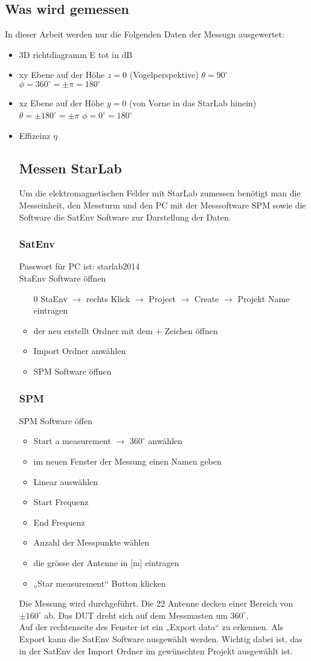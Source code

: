 \subsection{Was wird gemessen}
In dieser Arbeit werden nur die Folgenden Daten der Messugn ausgewertet:
\begin{itemize}
	\item 3D richtdiagramm E tot in dB
	\item xy Ebene auf der Höhe $z=0$ (Vogelperspektive) $\theta=90^\circ$ $\phi=360^\circ= \pm \pi=180^\circ$
	\item xz Ebene auf der Höhe $y=0$ (von Vorne in das StarLab hinein) $\theta=\pm 180^\circ =\pm \pi$ $\phi= 0^\circ = 180^\circ$
	\item Effizeinz $\eta$
	\subsection{Messen StarLab}
	Um die elektromagnetischen Felder mit StarLab zumessen benötigt man  die Messeinheit, den Messturm und den PC mit der Messsoftware SPM sowie die Software die SatEnv Software  zur Darstellung der Daten.
	\subsubsection{SatEnv}
	Passwort für PC ist: starlab2014\\
	StaEnv Software öffnen
	\begin{itemize}
	\item [0]StaEnv $\rightarrow$ rechts Klick $\rightarrow$ Project $\rightarrow$ Create $\rightarrow$ Projekt Name eintragen
	\item der neu erstellt Ordner mit dem $+$ Zeichen öffnen
	\item Import Ordner anwählen
	\item SPM Software öffnen
	\end{itemize}
	\subsubsection{SPM}
	SPM Software öffen
	\begin{itemize}
	\item Start a measurement $\rightarrow$ $360^\circ$ anwählen 
	\item im neuen Fenster der Messung einen Namen geben
	\item Linear auswählen
	\item Start Frequenz
	\item End Frequenz 
	\item Anzahl der Messpunkte wählen
	\item die grösse der Antenne in [m] eintragen
	\item „Star measurement“ Button klicken
	\end{itemize}
	Die Messung wird durchgeführt. Die 22 Antenne decken einer Bereich von $\pm 160^\circ$ ab. Das DUT dreht sich auf dem Messmasten um $360^\circ$.\\
	Auf der rechtenseite des Fenster ist ein „Export data“ zu erkennen. Als Export kann die SatEnv Software ausgewählt werden. Wichtig dabei ist, das in der SatEnv der Import Ordner im gewünschten Projekt ausgewählt ist.
	

\end{itemize}

